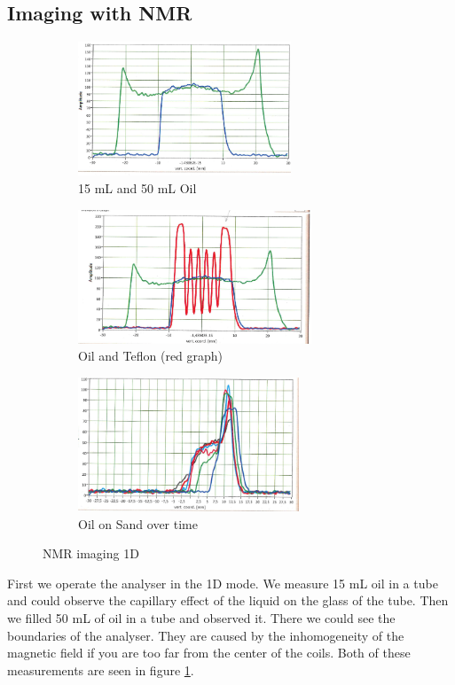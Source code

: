 \subsection{Imaging with NMR}\label{imaging-with-nmr}
\begin{figure}[h]
	\begin{subfigure}{0.32\textwidth}
	\includegraphics[width=0.9\linewidth ,height=4cm]{images/oil15_50.png}
	\caption{15 mL and 50 mL Oil}
	\label{NMR1}
	\end{subfigure}
	\begin{subfigure}{0.32\textwidth}
	\includegraphics[width=0.9\linewidth ,height=4cm]{images/oil_teflon.png}
	\caption{Oil and Teflon (red graph)}
	\label{NMR2}
	\end{subfigure}
	\begin{subfigure}{0.32\textwidth}
	\includegraphics[width=0.9\linewidth, height=4cm]{images/oil_sand.png}
	\caption{Oil on Sand over time}
	\label{NMR3}
	\end{subfigure}
	\caption{NMR imaging 1D}
\end{figure}
First we operate the analyser in the 1D mode. We measure 15 mL oil in a tube and could observe the capillary effect of the liquid on the glass of the tube. Then we filled 50 mL of oil in a tube and observed it. There we could see the boundaries of the analyser. They are caused by the inhomogeneity of the magnetic field if you are too far from the center of the coils. Both of these measurements are seen in figure \ref{NMR1}. \\
